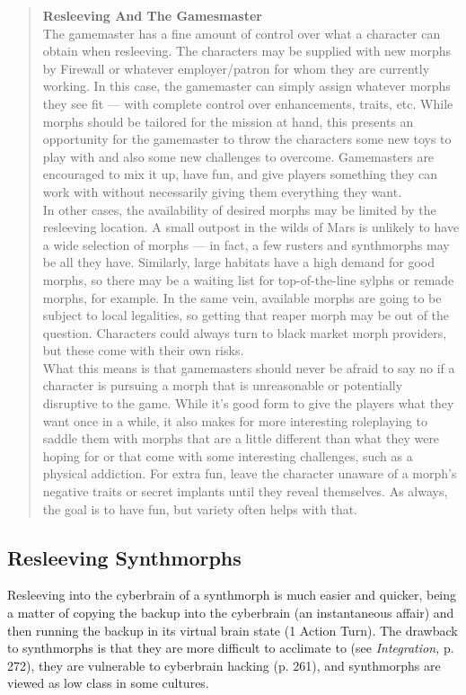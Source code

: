 \begin{quotation}
\textbf{Resleeving And The Gamesmaster} %
\\
The gamemaster has a fine amount of control over what a character can obtain when resleeving. The
characters may be supplied with new morphs by Firewall or whatever employer/patron for whom they are
currently working. In this case, the gamemaster can simply assign whatever morphs they see fit — with complete
control over enhancements, traits, etc. While morphs should be tailored for the mission at hand, this
presents an opportunity for the gamemaster to throw the characters some new toys to play with and also
some new challenges to overcome. Gamemasters are encouraged to mix it up, have fun, and give players
something they can work with without necessarily giving them everything they want.\\
In other cases, the availability of desired morphs may be limited by the resleeving location. A small
outpost in the wilds of Mars is unlikely to have a wide selection of morphs — in fact, a few rusters and
synthmorphs may be all they have. Similarly, large habitats have a high demand for good morphs, so there
may be a waiting list for top-of-the-line sylphs or remade morphs, for example. In the same vein, available
morphs are going to be subject to local legalities, so getting that reaper morph may be out of the question.
Characters could always turn to black market morph providers, but these come with their own risks.\\
What this means is that gamemasters should never be afraid to say no if a character is pursuing a morph
that is unreasonable or potentially disruptive to the game. While it’s good form to give the players what they
want once in a while, it also makes for more interesting roleplaying to saddle them with morphs that are
a little different than what they were hoping for or that come with some interesting challenges, such as a
physical addiction. For extra fun, leave the character unaware of a morph’s negative traits or secret implants
until they reveal themselves. As always, the goal is to have fun, but variety often helps with that.
\end{quotation}

\subsection{Resleeving Synthmorphs}

Resleeving into the cyberbrain of a synthmorph is much 
easier and quicker, being a matter of copying the backup 
into the cyberbrain (an instantaneous affair) and then 
running the backup in its virtual brain state (1 Action 
Turn). The drawback to synthmorphs is that they are 
more difficult to acclimate to (see \textit{Integration,} p. 272), 
they are vulnerable to cyberbrain hacking (p. 261), and 
synthmorphs are viewed as low class in some cultures.

